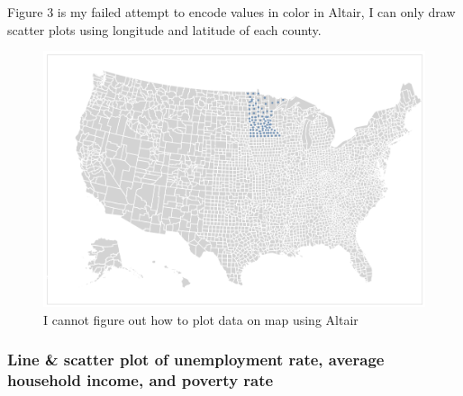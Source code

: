 \documentclass{article}
\begin{document}
\noindent
Figure 3 is my failed attempt to encode values in color in Altair, I can only draw scatter plots using longitude and latitude of each county. \\
\begin{figure}[htbp]
    \centering
    \includegraphics[scale=0.3]{NA_att.png}
    \caption{I cannot figure out how to plot data on map using Altair}
\end{figure}

\subsubsection*{Line \& scatter plot of unemployment rate, average household income, and poverty rate}
\end{document}
